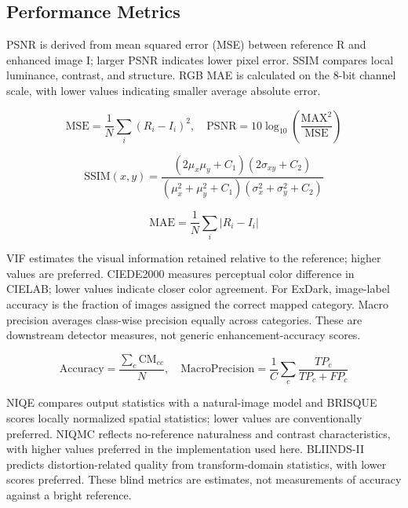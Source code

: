 \documentclass[conference]{IEEEtran}
\begin{document}
\subsection{Performance Metrics}

PSNR is derived from mean squared error (MSE) between reference R and enhanced image I; larger PSNR indicates lower pixel error. SSIM compares local luminance, contrast, and structure. RGB MAE is calculated on the 8-bit channel scale, with lower values indicating smaller average absolute error.

\begin{equation}\mathrm{MSE}=\frac{1}{N}\sum_i(R_i-I_i)^2,\quad \mathrm{PSNR}=10\log_{10}\left(\frac{\mathrm{MAX}^2}{\mathrm{MSE}}\right)\tag{5}\end{equation}

\begin{equation}\mathrm{SSIM}(x,y)=\frac{(2\mu_x\mu_y+C_1)(2\sigma_{xy}+C_2)}{(\mu_x^2+\mu_y^2+C_1)(\sigma_x^2+\sigma_y^2+C_2)}\tag{6}\end{equation}

\begin{equation}\mathrm{MAE}=\frac{1}{N}\sum_i|R_i-I_i|\tag{7}\end{equation}

VIF estimates the visual information retained relative to the reference; higher values are preferred. CIEDE2000 measures perceptual color difference in CIELAB; lower values indicate closer color agreement. For ExDark, image-label accuracy is the fraction of images assigned the correct mapped category. Macro precision averages class-wise precision equally across categories. These are downstream detector measures, not generic enhancement-accuracy scores.

\begin{equation}\mathrm{Accuracy}=\frac{\sum_c\mathrm{CM}_{cc}}{N},\quad \mathrm{MacroPrecision}=\frac{1}{C}\sum_c\frac{TP_c}{TP_c+FP_c}\tag{8}\end{equation}

NIQE compares output statistics with a natural-image model and BRISQUE scores locally normalized spatial statistics; lower values are conventionally preferred. NIQMC reflects no-reference naturalness and contrast characteristics, with higher values preferred in the implementation used here. BLIINDS-II predicts distortion-related quality from transform-domain statistics, with lower scores preferred. These blind metrics are estimates, not measurements of accuracy against a bright reference.
\end{document}
